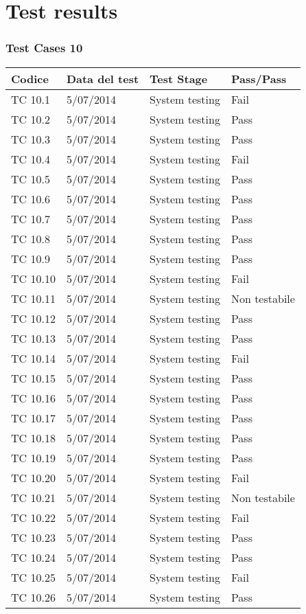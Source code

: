 \chapter{Test results}

\subsection{Test Cases 10}

\begin{longtable}{|p{3cm}|p{3cm}|p{3cm}|p{3cm}|}
	\hline
	\rowcolor{Gray}
	\textbf{Codice} & \textbf{Data del test} & \textbf{Test Stage} & \textbf{Pass/Pass}\tabularnewline
	\hline
	TC 10.1			& 5/07/2014 			& System testing		& Fail \tabularnewline
	\hline
	TC 10.2			& 5/07/2014 			& System testing		& Pass \tabularnewline
	\hline
	TC 10.3			& 5/07/2014 			& System testing		& Pass \tabularnewline
	\hline
	TC 10.4			& 5/07/2014 			& System testing		& Fail \tabularnewline
	\hline
	TC 10.5			& 5/07/2014 			& System testing		& Pass \tabularnewline
	\hline
	TC 10.6			& 5/07/2014 			& System testing		& Pass \tabularnewline
	\hline
	TC 10.7			& 5/07/2014 			& System testing		& Pass \tabularnewline
	\hline
	TC 10.8			& 5/07/2014 			& System testing		& Pass \tabularnewline
	\hline
	TC 10.9			& 5/07/2014 			& System testing		& Pass \tabularnewline
	\hline
	TC 10.10		& 5/07/2014 			& System testing		& Fail \tabularnewline
	\hline
	TC 10.11		& 5/07/2014 			& System testing		& Non testabile \tabularnewline
	\hline
	TC 10.12		& 5/07/2014 			& System testing		& Pass \tabularnewline
	\hline
	TC 10.13		& 5/07/2014 			& System testing		& Pass \tabularnewline
	\hline
	TC 10.14		& 5/07/2014 			& System testing		& Fail \tabularnewline
	\hline
	TC 10.15		& 5/07/2014 			& System testing		& Pass \tabularnewline
	\hline
	TC 10.16		& 5/07/2014 			& System testing		& Pass \tabularnewline
	\hline
	TC 10.17		& 5/07/2014 			& System testing		& Pass \tabularnewline
	\hline
	TC 10.18		& 5/07/2014 			& System testing		& Pass \tabularnewline
	\hline
	TC 10.19		& 5/07/2014 			& System testing		& Pass \tabularnewline
	\hline
	TC 10.20		& 5/07/2014 			& System testing		& Fail \tabularnewline
	\hline
	TC 10.21		& 5/07/2014 			& System testing		& Non testabile \tabularnewline
	\hline
	TC 10.22		& 5/07/2014 			& System testing		& Fail \tabularnewline
	\hline
	TC 10.23		& 5/07/2014 			& System testing		& Pass \tabularnewline
	\hline
	TC 10.24		& 5/07/2014 			& System testing		& Pass \tabularnewline
	\hline
	TC 10.25		& 5/07/2014 			& System testing		& Fail \tabularnewline
	\hline
	TC 10.26		& 5/07/2014 			& System testing		& Pass \tabularnewline

\end{longtable}
